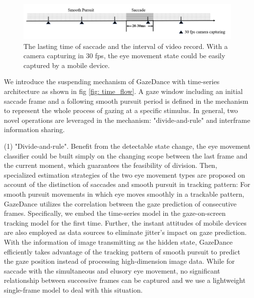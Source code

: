 \documentclass[acmlarge]{acmart}
\begin{document}
\begin{figure} 
  \centering
  \includegraphics[scale=0.5]{pictures/time_interval.jpg}
  \caption{The lasting time of saccade and the interval of video record. With a camera capturing in 30 fps, the eye movement state could be easily captured by a mobile device.}
  \label{fig: time_interval}
\end{figure}

We introduce the suspending mechanism of GazeDance with time-series architecture as shown in fig \ref{fig: time_flow}. 
A gaze window including an initial saccade frame and a following smooth pursuit period is defined in the mechanism to represent the whole process of gazing at a specific stimulus. In general, two novel operations are leveraged in the mechanism: "divide-and-rule" and interframe information sharing.

(1) "Divide-and-rule". Benefit from the detectable state change, the eye movement classifier could be built simply on the changing scope between the last frame and the current moment, which guarantees the feasibility of division. Then, specialized estimation strategies of the two eye movement types are proposed on account of the distinction of saccades and smooth pursuit in tracking pattern: For smooth pursuit movements in which eye moves smoothly in a trackable pattern, GazeDance utilizes the correlation between the gaze prediction of consecutive frames. Specifically, we embed the time-series model in the gaze-on-screen tracking model for the first time. Further, the instant attitudes of mobile devices are also employed as data sources to eliminate jitter's impact on gaze prediction. With the information of image transmitting as the hidden state, GazeDance efficiently takes advantage of the tracking pattern of smooth pursuit to predict the gaze position instead of processing high-dimension image data. While for saccade with the simultaneous and elusory eye movement, no significant relationship between successive frames can be captured and we use a lightweight single-frame model to deal with this situation. 
\end{document}
